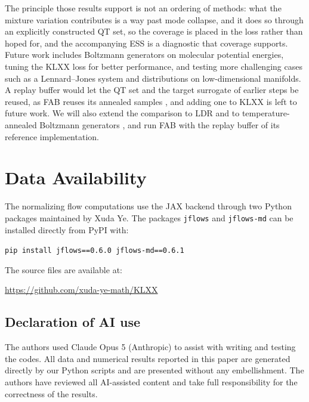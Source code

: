\documentclass{article}
\begin{document}
The principle those results support is not an ordering of methods: what the mixture variation contributes is a way past mode collapse, and it does so through an explicitly constructed QT set, so the coverage is placed in the loss rather than hoped for, and the accompanying ESS is a diagnostic that coverage supports. Future work includes Boltzmann generators on molecular potential energies, tuning the KLXX loss for better performance, and testing more challenging cases such as a Lennard--Jones system and distributions on low-dimensional manifolds. A replay buffer would let the QT set and the target surrogate of earlier steps be reused, as FAB reuses its annealed samples \citep{midgley2022flow}, and adding one to KLXX is left to future work. We will also extend the comparison to LDR and to temperature-annealed Boltzmann generators \citep{schopmans2026ldr,schopmans2025temperature}, and run FAB with the replay buffer of its reference implementation. 

\section*{Data Availability}

The normalizing flow computations use the JAX backend through two Python packages maintained by Xuda Ye. The packages \texttt{jflows} and \texttt{jflows-md} can be installed directly from PyPI with:
\begin{tcolorbox}[colback=gray!12,boxrule=0pt,arc=2pt,left=6pt,right=6pt,top=4pt,bottom=4pt]
\texttt{pip install jflows==0.6.0 jflows-md==0.6.1}
\end{tcolorbox}
\noindent
The source files are available at:
\begin{tcolorbox}[colback=gray!12,boxrule=0pt,arc=2pt,left=6pt,right=6pt,top=4pt,bottom=4pt]
\url{https://github.com/xuda-ye-math/KLXX}
\end{tcolorbox}

\subsection*{Declaration of AI use}
The authors used Claude Opus 5 (Anthropic) to assist with writing and testing the codes. All data and numerical results reported in this paper are generated directly by our Python scripts and are presented without any embellishment. The authors have reviewed all AI-assisted content and take full responsibility for the correctness of the results.

{
	
	
}
\end{document}
